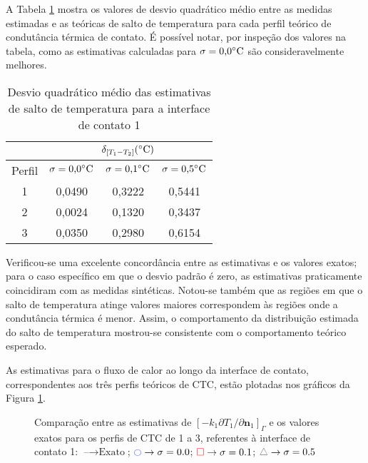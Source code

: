 A Tabela \ref{tabela_rms_delta_temperaturas_interface_1} mostra os valores de desvio quadrático médio entre as medidas estimadas e as teóricas de salto de temperatura para cada perfil teórico de condutância térmica de contato. É possível notar, por inspeção dos valores na tabela, como as estimativas calculadas para $\sigma = \text{0,0}\celsius$ são consideravelmente melhores.
\begin{table}[H]
	\centering
	\caption{Desvio quadrático médio das estimativas de salto de temperatura para a interface de contato 1}
	\begin{tabular}{c|c|c|c|}
		\cline{2-4}
		& \multicolumn{3}{c|}{$\delta_{[T_1 - T_2]} (\celsius)$} \\ \hline
		\multicolumn{1}{|c|}{Perfil} & $\sigma = \text{0,0}\celsius$   & $\sigma = \text{0,1}\celsius$    & $\sigma = \text{0,5}\celsius$  \\ \hline
		\multicolumn{1}{|c|}{1}      &  0,0490      & 0,3222       & 0,5441       \\ \hline
		\multicolumn{1}{|c|}{2}      &  0,0024      & 0,1320       & 0,3437      \\ \hline
		\multicolumn{1}{|c|}{3}      &  0,0350      & 0,2980       & 0,6154      \\ \hline
	\end{tabular}
	\label{tabela_rms_delta_temperaturas_interface_1}
\end{table}

Verificou-se uma excelente concordância entre as estimativas e os valores exatos; para o caso específico em que o desvio padrão é zero, as estimativas praticamente coincidiram com as medidas sintéticas. Notou-se também que as regiões em que o salto de temperatura atinge valores maiores correspondem às regiões onde a condutância térmica é menor. Assim, o comportamento da distribuição estimada do salto de temperatura mostrou-se consistente com o comportamento teórico esperado.

As estimativas para o fluxo de calor ao longo da interface de contato, correspondentes aos três perfis teóricos de CTC, estão plotadas nos gráficos da Figura \ref{figura_fluxo_calor_interface_01}.  
\begin{figure}[H]
	\caption{Comparação entre as estimativas de $[-k_1 {\partial T_1}/{\partial\mathbf{n}_1}]_\Gamma$ e os valores exatos para os perfis de CTC de 1 a 3, referentes à interface de contato 1: $\text{--} \rightarrow \text{Exato}$; $\textcolor{blue}{\ocircle} \rightarrow \sigma = 0.0$; $\textcolor{red}{\square} \rightarrow \sigma = 0.1$; $\textcolor{gray}{\triangle} \rightarrow \sigma = 0.5$}
	\label{figura_fluxo_calor_interface_01}
\end{figure}

